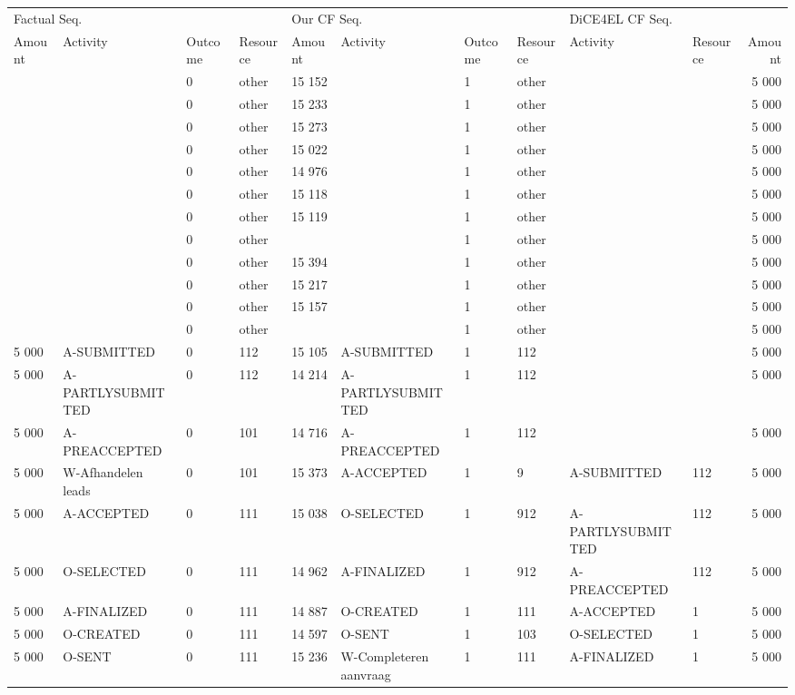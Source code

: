 \begin{tabular}{llllllllllr}
\toprule
\multicolumn{4}{l}{Factual Seq.} & \multicolumn{4}{l}{Our CF Seq.} & \multicolumn{3}{l}{DiCE4EL CF Seq.} \\
Amount & Activity & Outcome & Resource & Amount & Activity & Outcome & Resource & Activity & Resource & Amount \\
\midrule
 &  & 0 & other & 15 152 &  & 1 & other &  &  & 5 000 \\
 &  & 0 & other & 15 233 &  & 1 & other &  &  & 5 000 \\
 &  & 0 & other & 15 273 &  & 1 & other &  &  & 5 000 \\
 &  & 0 & other & 15 022 &  & 1 & other &  &  & 5 000 \\
 &  & 0 & other & 14 976 &  & 1 & other &  &  & 5 000 \\
 &  & 0 & other & 15 118 &  & 1 & other &  &  & 5 000 \\
 &  & 0 & other & 15 119 &  & 1 & other &  &  & 5 000 \\
 &  & 0 & other &  &  & 1 & other &  &  & 5 000 \\
 &  & 0 & other & 15 394 &  & 1 & other &  &  & 5 000 \\
 &  & 0 & other & 15 217 &  & 1 & other &  &  & 5 000 \\
 &  & 0 & other & 15 157 &  & 1 & other &  &  & 5 000 \\
 &  & 0 & other &  &  & 1 & other &  &  & 5 000 \\
5 000 & A-SUBMITTED & 0 & 112 & 15 105 & A-SUBMITTED & 1 & 112 &  &  & 5 000 \\
5 000 & A-PARTLYSUBMITTED & 0 & 112 & 14 214 & A-PARTLYSUBMITTED & 1 & 112 &  &  & 5 000 \\
5 000 & A-PREACCEPTED & 0 & 101 & 14 716 & A-PREACCEPTED & 1 & 112 &  &  & 5 000 \\
5 000 & W-Afhandelen leads & 0 & 101 & 15 373 & A-ACCEPTED & 1 & 9 & A-SUBMITTED & 112 & 5 000 \\
5 000 & A-ACCEPTED & 0 & 111 & 15 038 & O-SELECTED & 1 & 912 & A-PARTLYSUBMITTED & 112 & 5 000 \\
5 000 & O-SELECTED & 0 & 111 & 14 962 & A-FINALIZED & 1 & 912 & A-PREACCEPTED & 112 & 5 000 \\
5 000 & A-FINALIZED & 0 & 111 & 14 887 & O-CREATED & 1 & 111 & A-ACCEPTED & 1 & 5 000 \\
5 000 & O-CREATED & 0 & 111 & 14 597 & O-SENT & 1 & 103 & O-SELECTED & 1 & 5 000 \\
5 000 & O-SENT & 0 & 111 & 15 236 & W-Completeren aanvraag & 1 & 111 & A-FINALIZED & 1 & 5 000 \\

\end{tabular}

